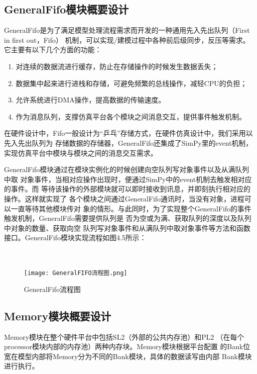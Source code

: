 \subsection{GeneralFifo模块概要设计}
GeneralFifo是为了满足模型处理流程需求而开发的一种通用先入先出队列（First in first out，Fifo）
机制\cite{31}，可以实现/建模过程中各种前后级同步，反压等需求。它主要有以下几个方面的功能：

\begin{enumerate}
    \item 对连续的数据流进行缓存，防止在存储操作的时候发生数据丢失；
    \item 数据集中起来进行进栈和存储，可避免频繁的总线操作，减轻CPU的负担；
    \item 允许系统进行DMA操作，提高数据的传输速度。
    \item 作为消息队列，支撑仿真平台各个模块之间消息交互，提供事件触发机制。
\end{enumerate}

在硬件设计中，Fifo一般设计为“乒乓”存储方式，在硬件仿真设计中，我们采用以先入先出队列为
存储数据的存储器，GeneralFifo还集成了SimPy里的event机制，实现仿真平台中模块与模块之间的消息交互需求。

GeneralFifo模块通过在模块实例化的时候创建向空队列写对象事件以及从满队列中取
对象事件，当相对应操作出现时，便通过SimPy中的event机制去触发相对应的事件。而
等待该操作的外部模块就可以即时接收到讯息，并即刻执行相对应的操作。这样就实现了
各个模块之间通过GeneralFifo通讯时，当没有对象，进程可以一直等待其他模块传对
象的情形。与此同时，为了实现整个GeneralFifo的事件触发机制，GeneralFifo需要提供队列是
否为空或为满、获取队列的深度以及队列中对象的数量、获取向空
队列写对象事件和从满队列中取对象事件等方法和函数接口。GeneralFifo模块实现流程如图4.5所示：
\\
\\
\\

\begin{figure}[h]
    \centering
    \texttt{[image: GeneralFIFO流程图.png]}
    \caption{GeneralFifo流程图}
    \label{fig:badge}
\end{figure}

\subsection{Memory模块概要设计}
Memory模块\cite{32}在整个硬件平台中包括SL2（外部的公共内存池）和PL2
（在每个processor模块内部的内存池）两种内存块。Memory模块根据平台配置
的Bank位宽在模型内部将Memory分为不同的Bank模块，具体的数据读写由内部
Bank模块进行执行。


